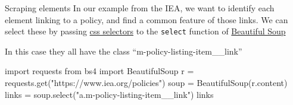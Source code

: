 \documentclass[
  10pt,
  ignorenonframetext,
  aspectratio=169]{beamer}
\newenvironment{Shaded}{\begin{snugshade}}{\end{snugshade}}
\newcommand{\ImportTok}[1]{\textcolor[rgb]{0.80,0.80,0.80}{#1}}
\newcommand{\NormalTok}[1]{\textcolor[rgb]{0.80,0.80,0.80}{#1}}
\newcommand{\OperatorTok}[1]{\textcolor[rgb]{0.94,0.94,0.82}{#1}}
\newcommand{\StringTok}[1]{\textcolor[rgb]{0.80,0.58,0.58}{#1}}
\begin{document}
\begin{frame}[fragile]{Scraping elements}
\protect\hypertarget{scraping-elements-1}{}
In our example from the IEA, we want to identify each element linking to
a policy, and find a common feature of those links. We can select these
by passing
\href{https://developer.mozilla.org/en-US/docs/Learn/CSS/Building_blocks/Selectors}{css
selectors} to the \texttt{select} function of
\href{https://www.crummy.com/software/BeautifulSoup/bs4/doc/\#css-selectors}{Beautiful
Soup}

In this case they all have the class ``m-policy-listing-item\_\_link''

\scriptsize

\begin{Shaded}
\begin{Highlighting}[]
\ImportTok{import}\NormalTok{ requests}
\ImportTok{from}\NormalTok{ bs4 }\ImportTok{import}\NormalTok{ BeautifulSoup}
\NormalTok{r }\OperatorTok{=}\NormalTok{ requests.get(}\StringTok{"https://www.iea.org/policies"}\NormalTok{)}
\NormalTok{soup }\OperatorTok{=}\NormalTok{ BeautifulSoup(r.content)}
\NormalTok{links }\OperatorTok{=}\NormalTok{ soup.select(}\StringTok{"a.m{-}policy{-}listing{-}item\_\_link"}\NormalTok{)}
\NormalTok{links}
\end{Highlighting}
\end{Shaded}


\end{frame}
\end{document}
